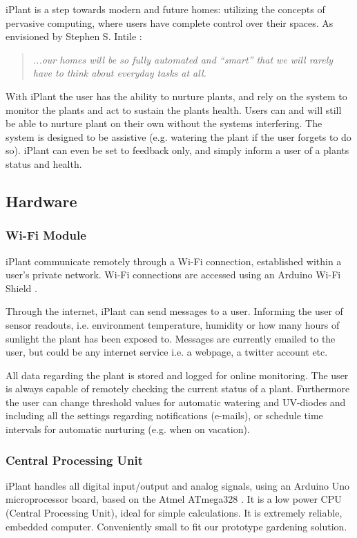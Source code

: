 \documentclass{ubicomp2012}
\begin{document}
iPlant is a step towards modern and future homes: utilizing the concepts of pervasive computing, where users have complete control over their spaces. As envisioned by Stephen S. Intile \cite{future-homes}: 
\begin{quotation} \em...our homes will be so fully automated and “smart” that we will rarely have to think about everyday tasks at all.
\end{quotation}
With iPlant the user has the ability to nurture plants, and rely on the system to monitor the plants and act to sustain the plants health. Users can and will still be able to nurture plant on their own without the systems interfering. The system is designed to be assistive (e.g. watering the plant if the user forgets to do so). iPlant can even be set to feedback only, and simply inform a user of a plants status and health.

\subsection{Hardware}
\subsubsection{Wi-Fi Module}
iPlant communicate remotely through a Wi-Fi connection, established within a user’s private network. Wi-Fi connections are accessed using an Arduino Wi-Fi Shield \cite{arduino-wifi}.

Through the internet, iPlant can send messages to a user. Informing the user of sensor readouts, i.e. environment temperature, humidity or how many hours of sunlight the plant has been exposed to. Messages are currently emailed to the user, but could be any internet service i.e. a webpage, a twitter account etc.

All data regarding the plant is stored and logged for online monitoring. The user is always capable of remotely checking the current status of a plant. Furthermore the user can change threshold values for automatic watering and UV-diodes and including all the settings regarding notifications (e-mails), or schedule time intervals for automatic nurturing (e.g. when on vacation).

\subsubsection{Central Processing Unit}
iPlant handles all digital input/output and analog signals, using an Arduino Uno microprocessor board, based on the Atmel ATmega328 \cite{atmel328,arduino-uno}. It is a low power CPU (Central Processing Unit), ideal for simple calculations. It is extremely reliable, embedded computer. Conveniently small to fit our prototype gardening solution.
\end{document}

